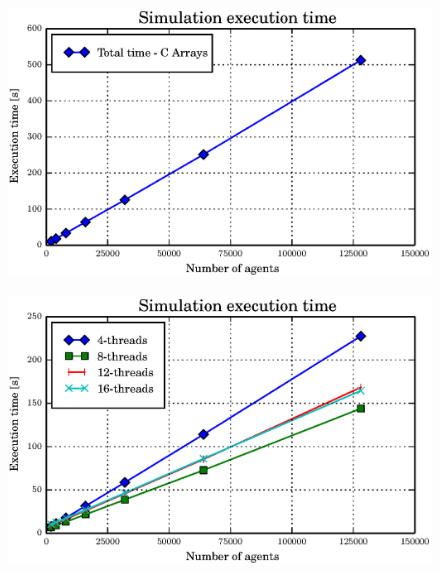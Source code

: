\documentclass[t]{beamer}
\begin{document}
\begin{frame}[c]
	\begin{figure}[H]
	  \begin{center}
	    \includegraphics[width=\columnwidth]{graphs/dict-array-perf.eps}
	  \end{center}
	\end{figure}
\end{frame}


\begin{frame}[c]
	\begin{figure}[H]
	  \begin{center}
	    \includegraphics[width=\columnwidth]{graphs/dict-array-multi-16-perf.eps}
	  \end{center}
	\end{figure}
\end{frame}
\end{document}
